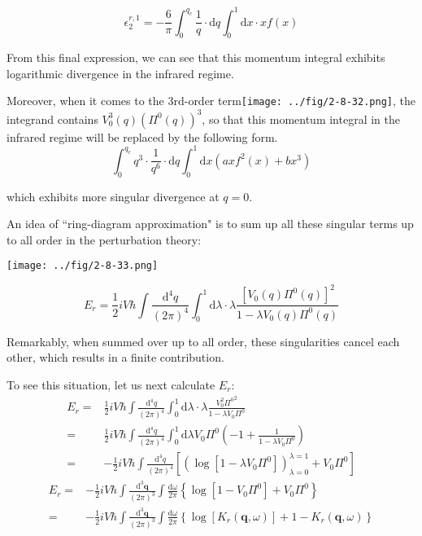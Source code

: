 \begin{equation*} \label{Eqs2.8.9.d} \tag{2.8.9.d}
\epsilon_2^{r,1}= -\frac{6}{\pi} \int_0^{q_c} \frac{1}{q} \cdot \mathrm{d} q \int_0^{1} \mathrm{d} x \cdot  x f(x)
\end{equation*}

From this final expression, we can see that this momentum integral exhibits logarithmic divergence in the infrared regime.

Moreover, when it comes to the 3rd-order term\texttt{[image: ../fig/2-8-32.png]}, the integrand contains $V_0^3(q) (\Pi^0(q))^3$, so that this momentum integral in the infrared regime will be replaced by the following form.
\begin{equation*} \label{Eqs2.8.9.e} \tag{2.8.9.e}
\int_0^{q_c}q^3 \cdot \frac{1}{q^6} \cdot \mathrm{d}q \int_0^1 \mathrm{d} x \left( a x f^2(x) + bx^3 \right)
\end{equation*}

which exhibits more singular divergence at $q=0$.

An idea of ``ring-diagram approximation" is to sum up all these singular terms up to all order in the perturbation theory:
\begin{center} \label{Fig2.8.33}
\texttt{[image: ../fig/2-8-33.png]}
\end{center}
\begin{equation*} \tag{2.8.9}
E_r = \frac{1}{2}i V\hbar \int \frac{\mathrm{d}^4 q}{(2\pi)^4} \int_0^1 \mathrm{d} \lambda \cdot \lambda \frac{[ V_0(q) \Pi^0(q)]^2}{1-\lambda V_0(q) \Pi^0(q)}
\end{equation*}

Remarkably, when summed over up to all order, these singularities cancel each other, which results in a finite contribution.

To see this situation, let us next calculate $E_r$:
\[\begin{split}
E_r =& \frac{1}{2}i V\hbar \int \frac{\mathrm{d}^4 q}{(2\pi)^4} \int_0^1 \mathrm{d} \lambda \cdot \lambda \frac{V_0^2 {\Pi^0}^2}{1-\lambda V_0\Pi^0}\\
=& \frac{1}{2}i V\hbar \int \frac{\mathrm{d}^4 q}{(2\pi)^4} \int_0^1 \mathrm{d} \lambda V_0 \Pi^0\left( -1 + \frac{1}{1-\lambda V_0 \Pi^0} \right)\\
=& - \frac{1}{2}i V\hbar \int \frac{\mathrm{d}^4 q}{(2\pi)^4}\left[\left( \log[1-\lambda V_0 \Pi^0] \right)_{\lambda=0}^{\lambda=1} + V_0 \Pi^0 \right]\end{split}\]
\begin{equation*} \label{Eqs2.8.9'} \tag{2.8.9'} \begin{split}
E_r=& - \frac{1}{2}i V\hbar \int \frac{\mathrm{d}^3 \mathbf{q}}{(2\pi)^3} \int \frac{\mathrm{d} \omega}{2\pi} \left\{ \log[1-V_0 \Pi^0] + V_0 \Pi^0 \right\}\\
=& - \frac{1}{2}i V\hbar \int \frac{\mathrm{d}^3 \mathbf{q}}{(2\pi)^3} \int \frac{\mathrm{d} \omega}{2\pi} \left\{ \log[K_r(\mathbf{q},\omega)] + 1-K_r(\mathbf{q},\omega) \right\}
\end{split}\end{equation*}

